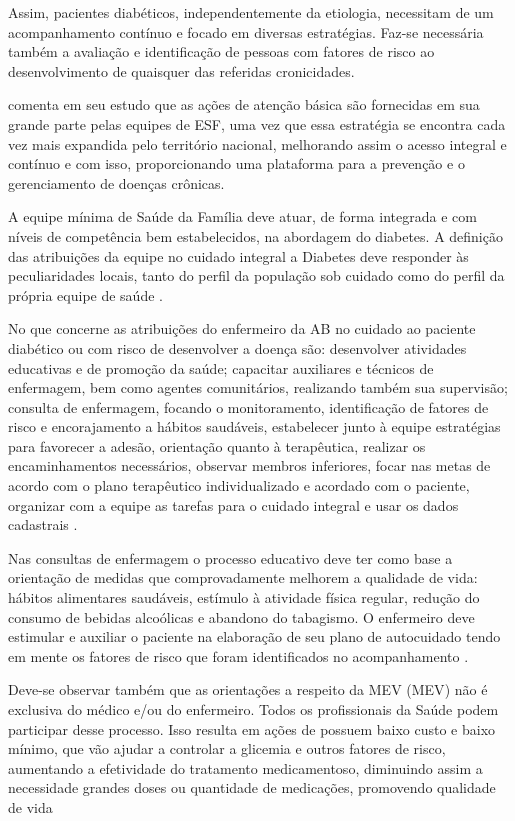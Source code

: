 Assim, pacientes diabéticos, independentemente da etiologia, necessitam de um acompanhamento contínuo e focado em diversas estratégias. Faz-se necessária também a avaliação e identificação de pessoas com fatores de risco ao desenvolvimento de quaisquer das referidas cronicidades. 

\cite{chor2011saude} comenta em seu estudo que as ações de atenção básica são fornecidas em sua grande parte pelas equipes de ESF, uma vez que essa estratégia se encontra cada vez mais expandida pelo território nacional, melhorando assim o acesso integral e contínuo e com isso, proporcionando uma plataforma para a prevenção e o gerenciamento de doenças crônicas.

A equipe mínima de Saúde da Família deve atuar, de forma integrada e com níveis de competência bem estabelecidos, na abordagem do diabetes. A definição das atribuições da equipe no cuidado integral a Diabetes deve responder às peculiaridades locais, tanto do perfil da população sob cuidado como do perfil da própria equipe de saúde \cite{atencaobasica16}.

No que concerne as atribuições do enfermeiro da AB no cuidado ao paciente diabético ou com risco de desenvolver a doença são: desenvolver atividades educativas e de promoção da saúde; capacitar auxiliares e técnicos de enfermagem, bem como agentes comunitários, realizando também sua supervisão; consulta de enfermagem, focando o monitoramento, identificação de fatores de risco e encorajamento a hábitos saudáveis, estabelecer junto à equipe estratégias para favorecer a adesão, orientação quanto à terapêutica, realizar os encaminhamentos necessários, observar membros inferiores, focar nas metas de acordo com o plano terapêutico individualizado e acordado com o paciente, organizar com a equipe as tarefas para o cuidado integral e usar os dados cadastrais \cite{atencaobasica16}.

Nas consultas de enfermagem o processo educativo deve ter como base a orientação de medidas que comprovadamente melhorem a qualidade de vida: hábitos alimentares saudáveis, estímulo à atividade física regular, redução do consumo de bebidas alcoólicas e abandono do tabagismo. O enfermeiro deve estimular e auxiliar o paciente na elaboração de seu plano de autocuidado tendo em mente os fatores de risco que foram identificados no acompanhamento \cite{atencaobasica16}.

Deve-se observar também que as orientações a respeito da \acrlong{MEV} (\acrshort{MEV}) não é exclusiva do médico e/ou do enfermeiro. Todos os profissionais da Saúde podem participar desse processo. Isso resulta em ações de possuem baixo custo e baixo mínimo, que vão ajudar a controlar a glicemia e outros fatores de risco, aumentando a efetividade do tratamento medicamentoso, diminuindo assim a necessidade grandes doses ou quantidade de medicações, promovendo qualidade de vida \cite{atencaobasica37}

